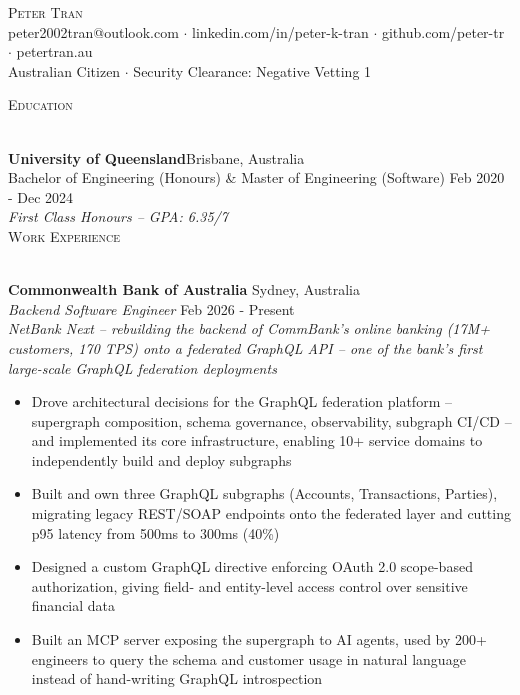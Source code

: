 \documentclass[a4paper]{article}
\newcommand{\lineunder}{
    \vspace*{-8pt} \\
    \hspace*{-18pt} \hrulefill \\
    \vspace*{-4pt}
}
\newcommand{\header}[1]{
    {\hspace*{-18pt}\vspace*{3pt} \textsc{#1}}
    \vspace*{-3pt} \lineunder
}
\begin{document}
\vspace*{-18pt}

\begin{center}
    {\Huge \scshape {Peter Tran}}\\
    peter2002tran@outlook.com $\cdot$ linkedin.com/in/peter-k-tran $\cdot$ github.com/peter-tr $\cdot$ petertran.au\\
    {\small Australian Citizen $\cdot$ Security Clearance: Negative Vetting 1}
\end{center}

\header{Education}
\vspace{1.5mm}
\textbf{University of Queensland}\hfill Brisbane, Australia\\
Bachelor of Engineering (Honours) \& Master of Engineering (Software) \hfill Feb 2020 - Dec 2024\\
\textit{First Class Honours -- GPA: 6.35/7}\\

\header{Work Experience}
\vspace{1.5mm}
\textbf{Commonwealth Bank of Australia} \hfill Sydney, Australia\\
\textit{Backend Software Engineer} \hfill Feb 2026 - Present\\
{\small \textit{NetBank Next -- rebuilding the backend of CommBank's online banking (17M+ customers, 170 TPS) onto a federated GraphQL API -- one of the bank's first large-scale GraphQL federation deployments}}\\
\vspace{-2mm}
\begin{itemize} \itemsep -1pt
    \item Drove architectural decisions for the GraphQL federation platform -- supergraph composition, schema governance, observability, subgraph CI/CD -- and implemented its core infrastructure, enabling 10+ service domains to independently build and deploy subgraphs
    \item Built and own three GraphQL subgraphs (Accounts, Transactions, Parties), migrating legacy REST/SOAP endpoints onto the federated layer and cutting p95 latency from 500ms to 300ms (40\%)
    \item Designed a custom GraphQL directive enforcing OAuth 2.0 scope-based authorization, giving field- and entity-level access control over sensitive financial data
    \item Built an MCP server exposing the supergraph to AI agents, used by 200+ engineers to query the schema and customer usage in natural language instead of hand-writing GraphQL introspection
\end{itemize}
\end{document}
